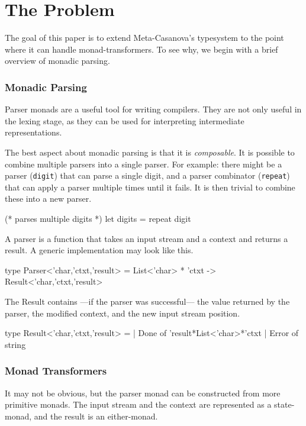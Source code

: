 \section{The Problem}
\begin{multicols}{2}\noindent
  The goal of this paper is to extend Meta-Casanova's typesystem to the point where it can handle monad-transformers.
  To see why, we begin with a brief overview of monadic parsing.
  
  \subsubsection*{Monadic Parsing}
  Parser monads are a useful tool for writing compilers.
  They are not only useful in the lexing stage,
  as they can be used for interpreting intermediate representations.

  The best aspect about monadic parsing is that it is \textit{composable}.
  It is possible to combine multiple parsers into a single parser.
  For example: there might be a parser (\texttt{digit}) that can parse a single digit,
  and a parser combinator (\texttt{repeat}) that can apply a parser multiple times until it fails.
  It is then trivial to combine these into a new parser.

  \begin{code}[language=Caml]
  (* parses multiple digits *)
  let digits = repeat digit
  \end{code}

  \noindent
  A parser is a function that takes an input stream and a context and returns a result.
  A generic implementation may look like this.

  \begin{code}[language=Caml]
  type Parser<'char,'ctxt,'result> =
    List<'char> * 'ctxt
      -> Result<'char,'ctxt,'result>
  \end{code}
  
  \noindent
  The Result contains ---if the parser was successful--- the value returned by the parser, the modified context, and the new input stream position.
  
  \begin{code}[language=Caml]
  type Result<'char,'ctxt,'result> = 
    | Done  of 'result*List<'char>*'ctxt
    | Error of string
  \end{code}

  \subsubsection*{Monad Transformers}
  \noindent
  It may not be obvious, but the parser monad can be constructed from more primitive monads.
  The input stream and the context are represented as a state-monad, and the result is an either-monad.


\end{multicols}
